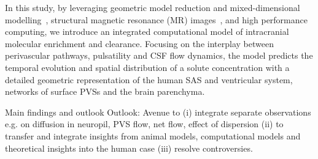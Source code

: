 \documentclass[fleqn,10pt]{wlscirep}
\begin{document}
In this study, by leveraging geometric model reduction and
mixed-dimensional modelling~\cite{masri2024modelling}, structural
magnetic resonance (MR) images~\cite{hodneland2019new}, and high
performance computing, we introduce an integrated computational model
of intracranial molecular enrichment and clearance. Focusing on the
interplay between perivascular pathways, pulsatility and CSF flow
dynamics, the model predicts the temporal evolution and spatial
distribution of a solute concentration with a detailed geometric
representation of the human SAS and ventricular system, networks of
surface PVSs and the brain
parenchyma. \textcolor{lightgray}{\lipsum[2]}


Main findings and outlook \textcolor{lightgray}{\lipsum[1]} Outlook:
  Avenue to (i) integrate separate observations e.g. on diffusion in
  neuropil, PVS flow, net flow, effect of dispersion (ii) to transfer
  and integrate insights from animal models, computational models and
  theoretical insights into the human case (iii) resolve
  controversies.


  


\end{document}

